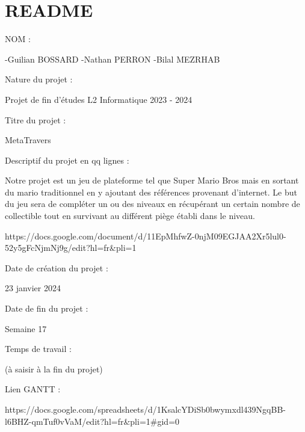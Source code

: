 \chapter{README}
\hypertarget{md_README}{}\label{md_README}
NOM \+: \begin{DoxyVerb}-Guilian BOSSARD
-Nathan PERRON
-Bilal MEZRHAB
\end{DoxyVerb}
 Nature du projet \+: \begin{DoxyVerb}Projet de fin d'études L2 Informatique 2023 - 2024
\end{DoxyVerb}
 Titre du projet \+: \begin{DoxyVerb}MetaTravers
\end{DoxyVerb}
 Descriptif du projet en qq lignes \+: \begin{DoxyVerb}Notre projet est un jeu de plateforme tel que Super Mario Bros mais en sortant du mario traditionnel en y ajoutant des références provenant d'internet. 
Le but du jeu sera de compléter un ou des niveaux en récupérant un certain nombre de collectible tout en survivant au différent piège établi dans le niveau.


https://docs.google.com/document/d/11EpMhfwZ-0njM09EGJAA2Xr5lul0-52y5gFcNjmNj9g/edit?hl=fr&pli=1 
\end{DoxyVerb}


Date de création du projet \+: \begin{DoxyVerb}23 janvier 2024
\end{DoxyVerb}


Date de fin du projet \+: \begin{DoxyVerb}Semaine 17
\end{DoxyVerb}


Temps de travail \+: \begin{DoxyVerb}(à saisir à la fin du projet)
\end{DoxyVerb}


Lien GANTT \+: \begin{DoxyVerb}https://docs.google.com/spreadsheets/d/1KsalcYDiSb0bwymxdl439NgqBB-l6BHZ-qmTuf0vVaM/edit?hl=fr&pli=1#gid=0
\end{DoxyVerb}
 